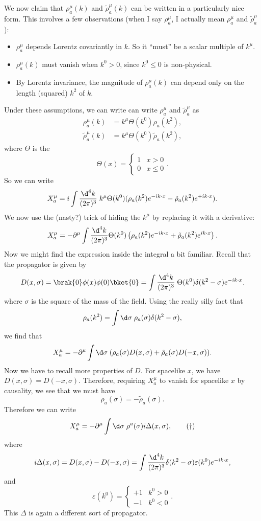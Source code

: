 \documentclass[a4paper]{article}
\begin{document}
We now claim that $\rho_a^\mu(k)$ and $\tilde{\rho}_a^\mu(k)$ can be written in a particularly nice form. This involves a few observations (when I say $\rho_a^\mu$, I actually mean $\rho_a^\mu$ and $\tilde{\rho}_a^\mu$):
\begin{itemize}
  \item $\rho_a^\mu$ depends Lorentz covariantly in $k$. So it ``must'' be a scalar multiple of $k^\mu$.
  \item $\rho_a^\mu(k)$ must vanish when $k^0 > 0$, since $k^0 \leq 0$ is non-physical. %
  \item By Lorentz invariance, the magnitude of $\rho_a^\mu(k)$ can depend only on the length (squared) $k^2$ of $k$.
\end{itemize}
Under these assumptions, we can write can write $\rho_a^\mu$ and $\tilde{\rho}_a^\mu$ as
\begin{align*}
  \rho_a^\mu (k) &= k^\mu \Theta(k^0) \rho_a (k^2),\\
  \tilde{\rho}_a^\mu (k) &= k^\mu \Theta(k^0) \tilde{\rho}_a(k^2),
\end{align*}
where $\Theta$ is the 
\[
  \Theta(x) =
  \begin{cases}
    1 & x > 0\\
    0 & x \leq 0
  \end{cases}.
\]
So we can write
\[
  X_a^\mu = i \int \frac{\d^4 k}{(2\pi)^3}\;k^\mu \Theta(k^0) (\rho_a(k^2)e^{-ik\cdot x} - \tilde{\rho}_a(k^2) e^{+ik\cdot x}).
\]
We now use the (nasty?) trick of hiding the $k^\mu$ by replacing it with a derivative:
\[
  X_a^\mu = - \partial^\mu \int \frac{\d^4 k}{(2\pi)^3} \Theta(k^0)\left(\rho_a(k^2) e^{-ik\cdot x} + \tilde{\rho}_a(k^2) e^{ik\cdot x}\right).
\]
Now we might find the expression inside the integral a bit familiar. Recall that the propagator is given by
\[
  D(x, \sigma) = \brak{0} \phi(x) \phi(0) \bket{0} = \int \frac{\d^4 k}{(2\pi)^3}\; \Theta(k^0) \delta(k^2 - \sigma) e^{-ik\cdot x}.
\]
where $\sigma$ is the square of the mass of the field. Using the really silly fact that
\[
  \rho_a(k^2) = \int \d \sigma\; \rho_a(\sigma) \delta(k^2 - \sigma),
\]
we find that
\[
  X_a^\mu = -\partial^\mu \int \d \sigma\; (\rho_a(\sigma) D(x, \sigma) + \tilde{\rho}_a (\sigma) D(-x, \sigma)).
\]
Now we have to recall more properties of $D$. For spacelike $x$, we have $D(x, \sigma) = D(-x, \sigma)$. Therefore, requiring $X_a^\mu$ to vanish for spacelike $x$ by causality, we see that we must have
\[
  \rho_a(\sigma) = - \tilde{\rho}_a(\sigma).
\]
Therefore we can write
\[
  X_a^\mu = -\partial^\mu \int \d \sigma\; \rho^a(\sigma) i\Delta(x, \sigma),\tag{$\dagger$}
\]
where
\[
  i \Delta(x, \sigma) = D(x, \sigma) - D(-x, \sigma) = \int \frac{\d^4 k}{(2\pi)^3} \delta(k^2 - \sigma) \varepsilon(k^0) e^{-ik\cdot x},
\]
and
\[
  \varepsilon(k^0) =
  \begin{cases}
    +1 & k^0 > 0\\
    -1 & k^0 < 0
  \end{cases}.
\]
This $\Delta$ is again a different sort of propagator.
\end{document}

